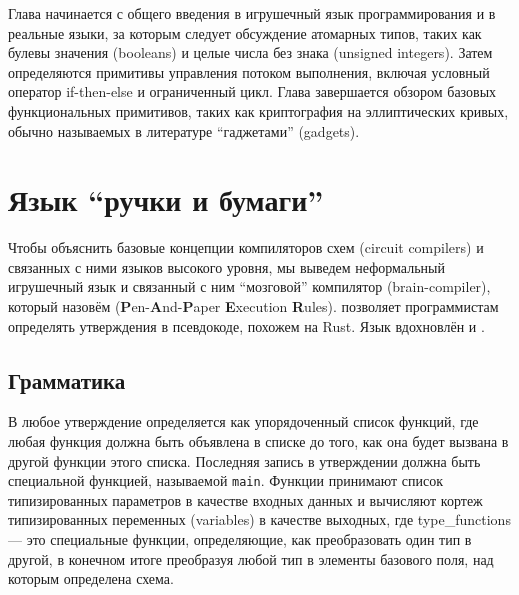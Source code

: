 Глава начинается с общего введения в игрушечный язык программирования и в реальные языки, за которым следует обсуждение атомарных типов, таких как булевы значения (booleans) и целые числа без знака (unsigned integers). Затем определяются примитивы управления потоком выполнения, включая условный оператор if-then-else и ограниченный цикл. Глава завершается обзором базовых функциональных примитивов, таких как криптография на эллиптических кривых, обычно называемых в литературе ``гаджетами'' (gadgets).

\section{Язык ``ручки и бумаги''} Чтобы объяснить базовые концепции компиляторов схем (circuit compilers) и связанных с ними языков высокого уровня, мы выведем неформальный игрушечный язык и связанный с ним ``мозговой'' компилятор (brain-compiler), который назовём  (\textbf{P}en-\textbf{A}nd-\textbf{P}aper \textbf{E}xecution \textbf{R}ules).  позволяет программистам определять утверждения в псевдокоде, похожем на Rust. Язык вдохновлён  и .
 
\subsection{Грамматика}
В  любое утверждение определяется как упорядоченный список функций, где любая функция должна быть объявлена в списке до того, как она будет вызвана в другой функции этого списка. Последняя запись в утверждении должна быть специальной функцией, называемой \texttt{main}. Функции принимают список типизированных параметров в качестве входных данных и вычисляют кортеж типизированных переменных (variables) в качестве выходных, где type\_functions --- это специальные функции, определяющие, как преобразовать один тип в другой, в конечном итоге преобразуя любой тип в элементы базового поля, над которым определена схема.

